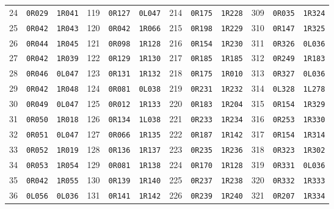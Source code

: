 \documentclass[11pt,letterpaper]{article}
\begin{document}
\begin{longtable}{@{}rll@{\qquad}rll@{\qquad}rll@{\qquad}rll@{}}
24 & \texttt{0R029} & \texttt{1R041} & 119 & \texttt{0R127} & \texttt{0L047} & 214 & \texttt{0R175} & \texttt{1R228} & 309 & \texttt{0R035} & \texttt{1R324} \\
25 & \texttt{0R042} & \texttt{1R043} & 120 & \texttt{0R042} & \texttt{1R066} & 215 & \texttt{0R198} & \texttt{1R229} & 310 & \texttt{0R147} & \texttt{1R325} \\
26 & \texttt{0R044} & \texttt{1R045} & 121 & \texttt{0R098} & \texttt{1R128} & 216 & \texttt{0R154} & \texttt{1R230} & 311 & \texttt{0R326} & \texttt{0L036} \\
27 & \texttt{0R042} & \texttt{1R039} & 122 & \texttt{0R129} & \texttt{1R130} & 217 & \texttt{0R185} & \texttt{1R185} & 312 & \texttt{0R249} & \texttt{1R183} \\
28 & \texttt{0R046} & \texttt{0L047} & 123 & \texttt{0R131} & \texttt{1R132} & 218 & \texttt{0R175} & \texttt{1R010} & 313 & \texttt{0R327} & \texttt{0L036} \\
29 & \texttt{0R042} & \texttt{1R048} & 124 & \texttt{0R081} & \texttt{0L038} & 219 & \texttt{0R231} & \texttt{1R232} & 314 & \texttt{0L328} & \texttt{1L278} \\
30 & \texttt{0R049} & \texttt{0L047} & 125 & \texttt{0R012} & \texttt{1R133} & 220 & \texttt{0R183} & \texttt{1R204} & 315 & \texttt{0R154} & \texttt{1R329} \\
31 & \texttt{0R050} & \texttt{1R018} & 126 & \texttt{0R134} & \texttt{1L038} & 221 & \texttt{0R233} & \texttt{1R234} & 316 & \texttt{0R253} & \texttt{1R330} \\
32 & \texttt{0R051} & \texttt{0L047} & 127 & \texttt{0R066} & \texttt{1R135} & 222 & \texttt{0R187} & \texttt{1R142} & 317 & \texttt{0R154} & \texttt{1R314} \\
33 & \texttt{0R052} & \texttt{1R019} & 128 & \texttt{0R136} & \texttt{1R137} & 223 & \texttt{0R235} & \texttt{1R236} & 318 & \texttt{0R323} & \texttt{1R302} \\
34 & \texttt{0R053} & \texttt{1R054} & 129 & \texttt{0R081} & \texttt{1R138} & 224 & \texttt{0R170} & \texttt{1R128} & 319 & \texttt{0R331} & \texttt{0L036} \\
35 & \texttt{0R042} & \texttt{1R055} & 130 & \texttt{0R139} & \texttt{1R140} & 225 & \texttt{0R237} & \texttt{1R238} & 320 & \texttt{0R332} & \texttt{1R333} \\
36 & \texttt{0L056} & \texttt{0L036} & 131 & \texttt{0R141} & \texttt{1R142} & 226 & \texttt{0R239} & \texttt{1R240} & 321 & \texttt{0R207} & \texttt{1R334} \\

\end{longtable}
\end{document}
